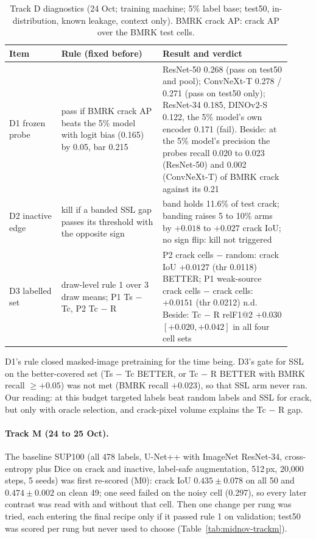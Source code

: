 \begin{table}[htbp]
\centering
\footnotesize
\caption[Track D diagnostics (24 Oct)]{Track D diagnostics (24 Oct; training machine; 5\% label base; test50, in-distribution,
known leakage, context only). BMRK crack AP: crack AP over the BMRK test cells.}
\label{tab:midnov-trackd}
\begin{tabular}{@{}p{0.17\linewidth}p{0.33\linewidth}p{0.42\linewidth}@{}}
\toprule
Item & Rule (fixed before) & Result and verdict \\
\midrule
D1 frozen probe & pass if BMRK crack AP beats the 5\% model with logit bias (0.165) by 0.05, bar 0.215 & ResNet-50 0.268 (pass on test50 and pool); ConvNeXt-T 0.278 / 0.271 (pass on test50 only); ResNet-34 0.185, DINOv2-S 0.122, the 5\% model's own encoder 0.171 (fail). Beside: at the 5\% model's precision the probes recall 0.020 to 0.023 (ResNet-50) and 0.002 (ConvNeXt-T) of BMRK crack against its 0.21 \\
D2 inactive edge & kill if a banded SSL gap passes its threshold with the opposite sign & band holds 11.6\% of test crack; banding raises 5 to 10\% arms by $+0.018$ to $+0.027$ crack IoU; no sign flip: kill not triggered \\
D3 labelled set & draw-level rule 1 over 3 draw means; P1 Ts $-$ Tc, P2 Tc $-$ R & P2 crack cells $-$ random: crack IoU $+0.0127$ (thr 0.0118) BETTER; P1 weak-source crack cells $-$ crack cells: $+0.0151$ (thr 0.0212) n.d. Beside: Tc $-$ R relF1@2 $+0.030$ $[+0.020, +0.042]$ in all four cell sets \\
\bottomrule
\end{tabular}
\end{table}

D1's rule closed masked-image pretraining for the time being. D3's gate for SSL on the better-covered set (Ts $-$ Tc BETTER, or Tc
$-$ R BETTER with BMRK recall $\geq +0.05$) was not met (BMRK recall $+0.023$), so that SSL arm never ran. Our reading: at this budget
targeted labels beat random labels and SSL for crack, but only with oracle selection, and crack-pixel volume explains the Tc $-$ R
gap.

\paragraph{Track M (24 to 25 Oct).} The baseline SUP100 (all 478 labels, U-Net++ with ImageNet ResNet-34, cross-entropy plus Dice on
crack and inactive, label-safe augmentation, 512\,px, 20,000 steps, 5 seeds) was first re-scored (M0): crack IoU $0.435 \pm 0.078$
on all 50 and $0.474 \pm 0.002$ on clean 49; one seed failed on the noisy cell (0.297), so every later contrast was read with and
without that cell. Then one change per rung was tried, each entering the final recipe only if it passed rule 1 on validation;
test50 was scored per rung but never used to choose (Table~\ref{tab:midnov-trackm}).


